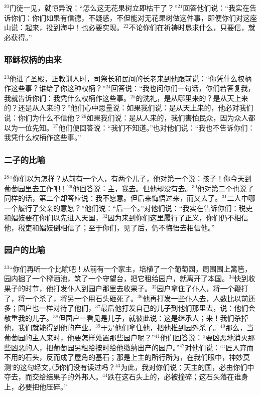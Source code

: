 $^{20}$门徒一见，就惊异说：“怎么这无花果树立即枯干了？”$^{21}$\UL[耶稣]回答他们说：“我实在告诉你们：你们如果有信德，不疑惑，不但能对无花果树做这件事，即便你们对这座山说：起来，投到海中！也必要实现。$^{22}$不论你们在祈祷时恳求什么，只要信，就必获得。”


\subsubsection{耶稣权柄的由来}
$^{23}$他进了圣殿，正教训人时，司祭长和民间的长老来到他跟前说：“你凭什么权柄作这些事？谁给了你这种权柄？”$^{24}$\UL[耶稣]回答说：“我也问你们一句话，你们若答复我，我就告诉你们：我凭什么权柄作这些事。$^{25}$\UL[若翰]的洗礼，是从哪里来的？是从天上来的？还是从人来的？”他们心中思量说：如果我们说：是从天上来的，他必对我们说：你们为什么不信他？$^{26}$如果我们说：是从人来的，我们害怕民众，因为众人都以\UL[若翰]为一位先知。$^{27}$他们便回答\UL[耶稣]说：“我们不知道。”\UL[耶稣]也对他们说：“我也不告诉你们：我凭什么权柄作这些事。”


\subsubsection{二子的比喻}
$^{28}$“你们以为怎样？从前有一个人，有两个儿子，他对第一个说：孩子！你今天到葡萄园里去工作吧！$^{29}$他回答说：主，我去。但他却没有去。$^{30}$他对第二个也说了同样的话，第二个却答应说：我不愿意。但后来悔悟过来，而又去了。$^{31}$二人中哪一个履行了父亲的意愿？”他们说：“后一个。”\UL[耶稣]对他们说：“我实在告诉你们：税吏和娼妓要在你们以先进入天国，$^{32}$因为\UL[若翰]来到你们这里履行了正义，你们仍不相信他，税吏和娼妓倒相信了；至于你们，见了后，仍不悔悟去相信他。”


\subsubsection{园户的比喻}
$^{33}$“你们再听一个比喻吧！从前有一个家主，培植了一个葡萄园，周围围上篱笆，园内掘了一个榨酒池，筑了一个守望台，把它租给园户，就离开了本国。$^{34}$快到收果子的时节，他打发仆人到园户那里去收果子。$^{35}$园户拿住了仆人，将一个鞭打了，将一个杀了，将另一个用石头砸死了。$^{36}$他再打发一些仆人去，人数比以前还多；园户也一样对待了他们，$^{37}$最后他打发自己的儿子到他们那里去，说：他们会敬重我的儿子。$^{38}$但园户一看见是儿子，就彼此说：这是继承人；来！我们杀掉他，我们就能得到他的产业。$^{39}$于是他们拿住他，把他推到园外杀了。$^{40}$那么，当葡萄园的主人来时，他要怎样处置那些园户呢？”$^{41}$他们回答说：“要凶恶地消灭那些凶恶的人，把葡萄园另租给按时给他缴纳出产的园户。”$^{42}$\UL[耶稣]对他们说：“‘匠人弃而不用的石头，反而成了屋角的基石；那是上主的所行所为，在我们眼中，神妙莫测’的这句经文，\textcircled{5}你们没有读过吗？$^{43}$为此，我对你们说：天主的国，必由你们中夺去，而交给结果子的外邦人。$^{44}$跌在这石头上的，必被撞碎；这石头落在谁身上，必要把他压碎。”

